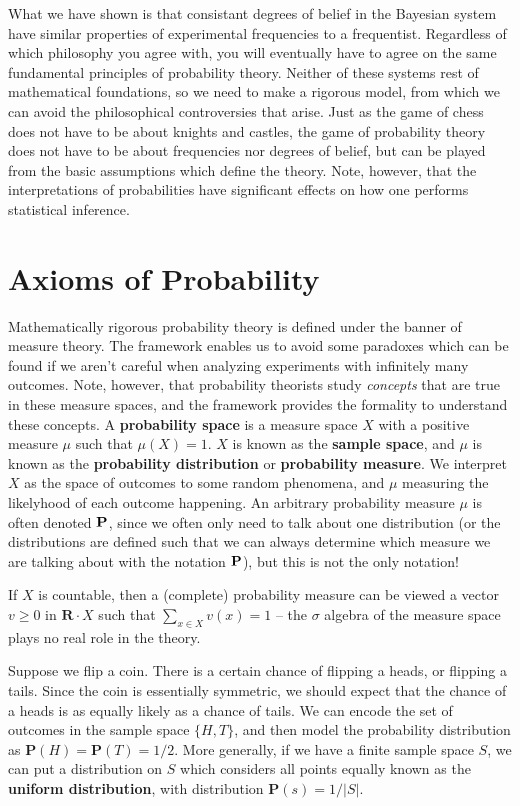 What we have shown is that consistant degrees of belief in the Bayesian system have similar properties of experimental frequencies to a frequentist. Regardless of which philosophy you agree with, you will eventually have to agree on the same fundamental principles of probability theory. Neither of these systems rest of mathematical foundations, so we need to make a rigorous model, from which we can avoid the philosophical controversies that arise. Just as the game of chess does not have to be about knights and castles, the game of probability theory does not have to be about frequencies nor degrees of belief, but can be played from the basic assumptions which define the theory. Note, however, that the interpretations of probabilities have significant effects on how one performs statistical inference.

\section{Axioms of Probability}

Mathematically rigorous probability theory is defined under the banner of measure theory. The framework enables us to avoid some paradoxes which can be found if we aren't careful when analyzing experiments with infinitely many outcomes. Note, however, that probability theorists study {\it concepts} that are true in these measure spaces, and the framework provides the formality to understand these concepts. A {\bf probability space} is a measure space $X$ with a positive measure $\mu$ such that $\mu(X) = 1$. $X$ is known as the {\bf sample space}, and $\mu$ is known as the {\bf probability distribution} or {\bf probability measure}. We interpret $X$ as the space of outcomes to some random phenomena, and $\mu$ measuring the likelyhood of each outcome happening. An arbitrary probability measure $\mu$ is often denoted $\operatorname{\mathbf{P}}$, since we often only need to talk about one distribution (or the distributions are defined such that we can always determine which measure we are talking about with the notation $\operatorname{\mathbf{P}}$), but this is not the only notation!

If $X$ is countable, then a (complete) probability measure can be viewed a vector $v \geq 0$ in $\mathbf{R} \cdot X$ such that $\sum_{x \in X} v(x) = 1$ -- the $\sigma$ algebra of the measure space plays no real role in the theory.

\begin{example}
    Suppose we flip a coin. There is a certain chance of flipping a heads, or flipping a tails. Since the coin is essentially symmetric, we should expect that the chance of a heads is as equally likely as a chance of tails. We can encode the set of outcomes in the sample space $\{ H, T \}$, and then model the probability distribution as $\mathbf{P}(H) = \mathbf{P}(T) = 1/2$. More generally, if we have a finite sample space $S$, we can put a distribution on $S$ which considers all points equally known as the {\bf uniform distribution}, with distribution $\mathbf{P}(s) = 1/|S|$.
\end{example}

